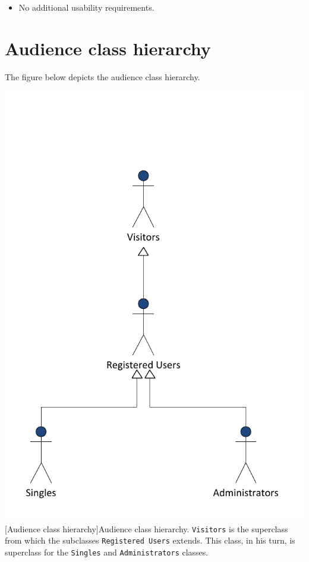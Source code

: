 \documentclass[11pt, a4paper,svglistings,oneside]{book}
\begin{document}
\begin{itemize}
\item No additional usability requirements.
\end{itemize}

\section{Audience class hierarchy}

The figure below depicts the audience class hierarchy. \\

\noindent\begin{minipage}{\textwidth}
    \centering
   \includegraphics[scale=1]{Users3.pdf}
 [Audience class hierarchy]{Audience class hierarchy. \texttt{Visitors} is the superclass from which the subclasses \texttt{Registered Users} extends. This class, in his turn, is superclass for the  \texttt{Singles} and \texttt{Administrators} classes.}
\end{minipage}
\end{document}
